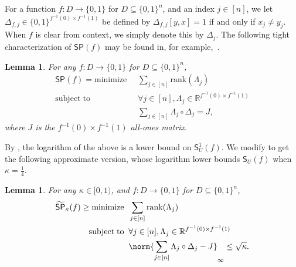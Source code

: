 \documentclass[11pt]{article}
\numberwithin{equation}{section}
\newtheorem{lemma}[theorem]{Lemma}
\theoremstyle{definition}
\theoremstyle{plain}
\newcommand{\R}{\mathbb R}
\begin{document}
For a function $f:D\rightarrow\{0,1\}$ for $D\subseteq\{0,1\}^n$, and an index $j\in[n]$, we let $\Delta_{f,j}\in\{0,1\}^{f^{-1}(0)\times f^{-1}(1)}$ be defined by $\Delta_{f,j}[y,x]=1$ if and only if $x_j\neq y_j$. 
When $f$ is clear from context, we simply denote this by $\Delta_j$. The following tight characterization of $\mathsf{SP}(f)$ may be found in, for example,~\cite{Lok09}.  
\begin{lemma}\label{lem:SP-opt}
For any $f:D\rightarrow \{0,1\}$ for $D\subseteq\{0,1\}^n$, 
\begin{align*}
\mathsf{SP}(f)=\mathrm{minimize}{}\;\;& \sum_{j\in [n]}\mathrm{rank}(\Lambda_j) \\
\mathrm{subject}\;\mathrm{to}{}\;\; & \forall j\in [n],\Lambda_j\in \R^{f^{-1}(0)\times f^{-1}(1)}\\
& \sum_{j\in [n]}\Lambda_j\circ\Delta_j=J,
\end{align*}
where $J$ is the $f^{-1}(0)\times f^{-1}(1)$ all-ones matrix.
\end{lemma}
By , the logarithm of the above is a lower bound on $\mathsf{S}_U^1(f)$. 
We modify  to get the following approximate version, whose logarithm lower bounds $\mathsf{S}_U(f)$ when $\kappa=\frac{1}{4}$.
\begin{lemma}\label{lem:SP-opt-approx}
For any $\kappa\in [0,1)$, and $f:D\rightarrow \{0,1\}$ for $D\subseteq\{0,1\}^n$, 
\begin{align}
\widetilde{\mathsf{SP}}_\kappa(f) \geq \mathrm{minimize}{}\;\;&\sum_{j\in [n]}\mathrm{rank}(\Lambda_j)\label{eq:SP-opt}\\
\mathrm{subject}\;\mathrm{to}{}\;\;& \forall j\in [n], \Lambda_j\in \R^{f^{-1}(0)\times f^{-1}(1)}\nonumber\\
& \norm{\sum_{j\in [n]}\Lambda_j\circ\Delta_j-J}_\infty\leq\sqrt\kappa. \nonumber
\end{align}
\end{lemma}
\end{document}
